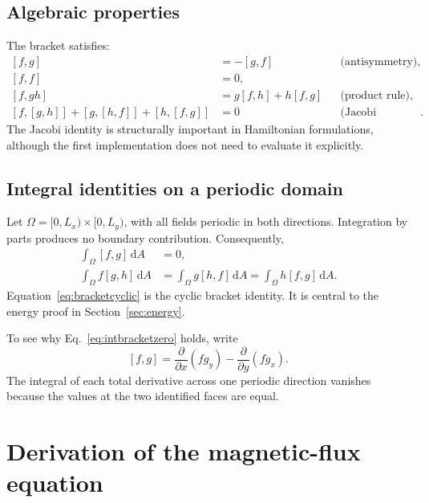 \documentclass[11pt]{article}
\newcommand{\dd}{\mathrm{d}}
\newcommand{\bracket}[2]{\left[#1,#2\right]}
\begin{document}
\subsection{Algebraic properties}

The bracket satisfies:
\begin{align}
\bracket{f}{g}&=-\bracket{g}{f}
&&\text{(antisymmetry)},\label{eq:bracketantisym}\\
\bracket{f}{f}&=0,\\
\bracket{f}{gh}&=g\bracket{f}{h}+h\bracket{f}{g}
&&\text{(product rule)},\\
\bracket{f}{\bracket{g}{h}}
+\bracket{g}{\bracket{h}{f}}
+\bracket{h}{\bracket{f}{g}}&=0
&&\text{(Jacobi identity)}.
\end{align}
The Jacobi identity is structurally important in Hamiltonian formulations, although the first implementation does not need to evaluate it explicitly.

\subsection{Integral identities on a periodic domain}

Let $\Omega=[0,L_x)\times[0,L_y)$, with all fields periodic in both directions. Integration by parts produces no boundary contribution. Consequently,
\begin{align}
\int_\Omega \bracket{f}{g}\,\dd A&=0,\label{eq:intbracketzero}\\
\int_\Omega f\bracket{g}{h}\,\dd A
&=\int_\Omega g\bracket{h}{f}\,\dd A
=\int_\Omega h\bracket{f}{g}\,\dd A.
\label{eq:bracketcyclic}
\end{align}
Equation~\eqref{eq:bracketcyclic} is the cyclic bracket identity. It is central to the energy proof in Section~\ref{sec:energy}.

To see why Eq.~\eqref{eq:intbracketzero} holds, write
\begin{equation}
\bracket{f}{g}
=\frac{\partial}{\partial x}(f g_y)
-\frac{\partial}{\partial y}(f g_x).
\end{equation}
The integral of each total derivative across one periodic direction vanishes because the values at the two identified faces are equal.

\section{Derivation of the magnetic-flux equation}
\label{sec:fluxderivation}
\end{document}
